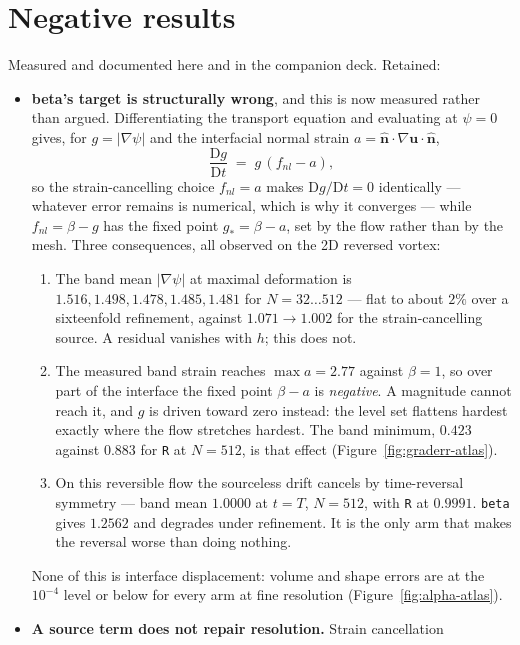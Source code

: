 \documentclass[preprint,3p,11pt]{elsarticle}
\newcommand{\psilev}{\psi}
\newcommand{\nhat}{\hat{\mathbf{n}}}
\newcommand{\gradpsi}{\lvert\nabla\psilev\rvert}
\begin{document}
\section{Negative results}
Measured and documented here and in the companion deck. Retained:
\begin{itemize}
  \item \textbf{beta's target is structurally wrong}, and this is now measured
    rather than argued. Differentiating the transport equation and evaluating at
    $\psilev=0$ gives, for $g=\gradpsi$ and the interfacial normal strain
    $a = \nhat\cdot\nabla\mathbf{u}\cdot\nhat$,
    \[
      \frac{\mathrm{D}g}{\mathrm{D}t} \;=\; g\,(f_{nl} - a),
    \]
    so the strain-cancelling choice $f_{nl}=a$ makes $\mathrm{D}g/\mathrm{D}t=0$
    identically --- whatever error remains is numerical, which is why it
    converges --- while $f_{nl} = \beta - g$ has the fixed point
    $g_\ast = \beta - a$, set by the flow rather than by the mesh. Three
    consequences, all observed on the 2D reversed vortex:
    \begin{enumerate}
      \item The band mean $\gradpsi$ at maximal deformation is
        $1.516, 1.498, 1.478, 1.485, 1.481$ for $N = 32\ldots512$ --- flat to
        about $2\%$ over a sixteenfold refinement, against $1.071 \to 1.002$ for
        the strain-cancelling source. A residual vanishes with $h$; this does
        not.
      \item The measured band strain reaches $\max a = 2.77$ against $\beta=1$,
        so over part of the interface the fixed point $\beta - a$ is
        \emph{negative}. A magnitude cannot reach it, and $g$ is driven toward
        zero instead: the level set flattens hardest exactly where the flow
        stretches hardest. The band minimum, $0.423$ against $0.883$ for
        \texttt{R} at $N=512$, is that effect
        (Figure~\ref{fig:graderr-atlas}).
      \item On this reversible flow the sourceless drift cancels by
        time-reversal symmetry --- band mean $1.0000$ at $t=T$, $N=512$, with
        \texttt{R} at $0.9991$. \texttt{beta} gives $1.2562$ and degrades under
        refinement. It is the only arm that makes the reversal worse than doing
        nothing.
    \end{enumerate}
    None of this is interface displacement: volume and shape errors are at the
    $10^{-4}$ level or below for every arm at fine resolution
    (Figure~\ref{fig:alpha-atlas}).
  \item \textbf{A source term does not repair resolution.} Strain cancellation

\end{itemize}
\end{document}
